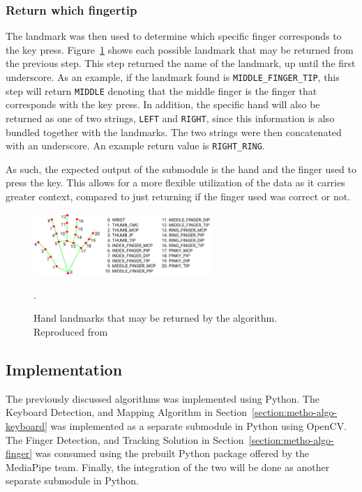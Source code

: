 \documentclass{report}
\begin{document}
\subsubsection{Return which fingertip}
The landmark was then used to determine which specific finger corresponds to the
key press. Figure~\ref{fig:metho-algo-integration-landmarks} shows each possible
landmark that may be returned from the previous step. This step returned the
name of the landmark, up until the first underscore. As an example, if the
landmark found is \texttt{MIDDLE\_FINGER\_TIP}, this step will return
\texttt{MIDDLE} denoting that the middle finger is the finger that corresponds
with the key press. In addition, the specific hand will also be returned as one
of two strings, \texttt{LEFT} and \texttt{RIGHT}, since this information is also
bundled together with the landmarks. The two strings were then concatenated with
an underscore. An example return value is \texttt{RIGHT\_RING}.

As such, the expected output of the submodule is the hand and the finger used to
press the key. This allows for a more flexible utilization of the data as it
carries greater context, compared to just returning if the finger used was
correct or not.

\begin{figure}[H]
	\centering
	\includegraphics[width=0.6\textwidth]{hand-landmarks.png}
	\caption{Hand landmarks that may be returned by the algorithm. Reproduced from }.
	\label{fig:metho-algo-integration-landmarks}
	\centering
\end{figure}

\subsection{Implementation}
\label{section:metho-algo-implementation}
The previously discussed algorithms was implemented using Python. The Keyboard
Detection, and Mapping Algorithm in Section~\ref{section:metho-algo-keyboard}
was implemented as a separate submodule in Python using OpenCV. The Finger
Detection, and Tracking Solution in Section~\ref{section:metho-algo-finger} was
consumed using the prebuilt Python package offered by the MediaPipe team.
Finally, the integration of the two will be done as another separate submodule
in Python.
\end{document}
